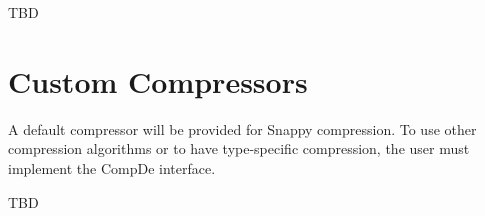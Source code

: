 \documentclass[11pt,a4paper]{article}
\begin{document}
		TBD
			
\section{Custom Compressors}
		A default compressor will be provided for Snappy compression.
		To use other compression algorithms or to have type-specific compression, the user must implement the CompDe interface.
		
		TBD
		
\end{document}
